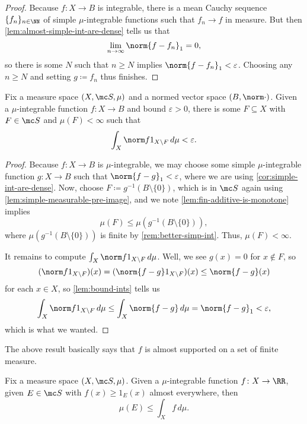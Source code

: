 \documentclass[../notes.tex]{subfiles}
\begin{document}
\begin{proof}
	Because $f\colon X\to B$ is integrable, there is a mean Cauchy sequence $\{f_n\}_{n\in\NN}$ of simple $\mu$-integrable functions such that $f_n\to f$ in measure. But then \autoref{lem:almost-simple-int-are-dense} tells us that
	\[\lim_{n\to\infty}\norm{f-f_n}_1=0,\]
	so there is some $N$ such that $n\ge N$ implies $\norm{f-f_n}_1<\varepsilon$. Choosing any $n\ge N$ and setting $g\coloneqq f_n$ thus finishes.
\end{proof}
\begin{lemma} \label{lem:almost-support-l1}
	Fix a measure space $(X,\mc S,\mu)$ and a normed vector space $(B,\norm\cdot)$. Given a $\mu$-integrable function $f\colon X\to B$ and bound $\varepsilon>0$, there is some $F\subseteq X$ with $F\in\mc S$ and $\mu(F)<\infty$ such that
	\[\int_X\norm f1_{X\setminus F}\,d\mu<\varepsilon.\]
\end{lemma}
\begin{proof}
	Because $f\colon X\to B$ is $\mu$-integrable, we may choose some simple $\mu$-integrable function $g\colon X\to B$ such that $\norm{f-g}_1<\varepsilon$, where we are using \autoref{cor:simple-int-are-dense}. Now, choose $F\coloneqq g^{-1}(B\setminus\{0\})$, which is in $\mc S$ again using \autoref{lem:simple-measurable-pre-image}, and we note \autoref{lem:fin-additive-is-monotone} implies
	\[\mu(F)\le\mu\left(g^{-1}(B\setminus\{0\})\right),\]
	where $\mu\left(g^{-1}(B\setminus\{0\})\right)$ is finite by \autoref{rem:better-simp-int}. Thus, $\mu(F)<\infty$.
	
	It remains to compute $\int_X\norm f1_{X\setminus F}\,d\mu$. Well, we see $g(x)=0$ for $x\notin F$, so
	\[(\norm f1_{X\setminus F})(x)=(\norm{f-g}1_{X\setminus F})(x)\le\norm{f-g}(x)\]
	for each $x\in X$, so \autoref{lem:bound-ints} tells us
	\[\int_X\norm f1_{X\setminus F}\,d\mu\le\int_X\norm{f-g}\,d\mu=\norm{f-g}_1<\varepsilon,\]
	which is what we wanted.
\end{proof}
\begin{remark}
	The above result basically says that $f$ is almost supported on a set of finite measure.
\end{remark}
\begin{lemma} \label{lem:bound-meas-set}
	Fix a measure space $(X,\mc S,\mu)$. Given a $\mu$-integrable function $f\colon X\to\RR$, given $E\in\mc S$ with $f(x)\ge1_E(x)$ almost everywhere, then
	\[\mu(E)\le\int_Xf\,d\mu.\]
\end{lemma}
\end{document}
